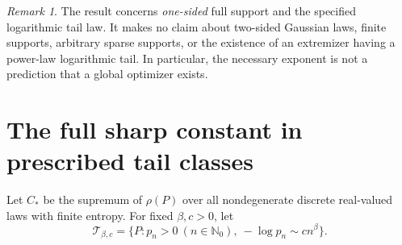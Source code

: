 \documentclass[11pt]{article}
\theoremstyle{remark}\newtheorem{remark}[theorem]{Remark}
\newcommand{\N}{\mathbb N_0}
\begin{document}
\begin{remark}
The result concerns \emph{one-sided} full support and the specified
logarithmic tail law. It makes no claim about two-sided Gaussian laws,
finite supports, arbitrary sparse supports, or the existence of an
extremizer having a power-law logarithmic tail. In particular, the
necessary exponent is not a prediction that a global optimizer exists.
\end{remark}

\section{The full sharp constant in prescribed tail classes}

Let $C_*$ be the supremum of $\rho(P)$ over all nondegenerate discrete
real-valued laws with finite entropy. For fixed $\beta,c>0$, let
\[
 \mathcal T_{\beta,c}=
 \{P:p_n>0\ (n\in\N),\ -\log p_n\sim c n^\beta\}.
\]
\end{document}
